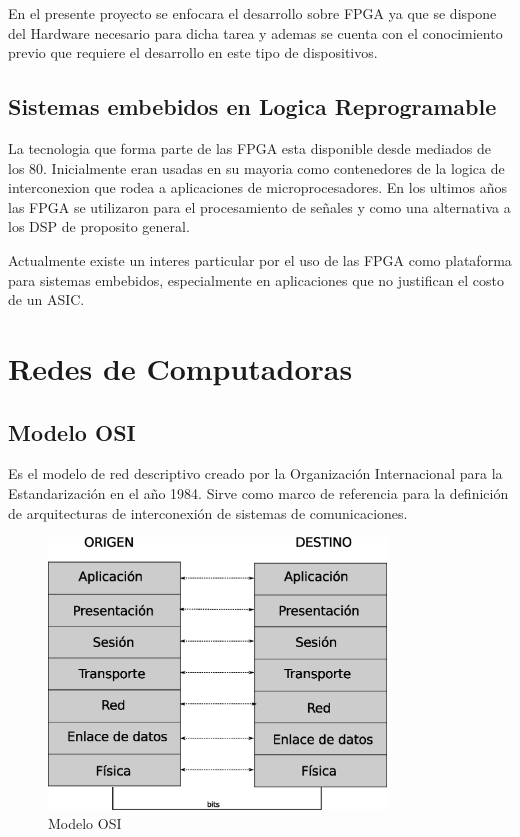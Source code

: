 En el presente proyecto se enfocara el desarrollo sobre FPGA ya que se dispone del Hardware necesario para dicha tarea y ademas se cuenta con el conocimiento previo que requiere el desarrollo en este tipo de dispositivos.
 

\subsection{Sistemas embebidos en Logica Reprogramable}

La tecnologia que forma parte de las FPGA esta disponible desde mediados de los 80. Inicialmente eran usadas en su mayoria como contenedores de la logica de interconexion que rodea a aplicaciones de microprocesadores. 
En los ultimos años las FPGA se utilizaron para el procesamiento de señales y como una alternativa a los DSP de proposito general.

Actualmente existe un interes particular por el uso de las FPGA como plataforma para sistemas embebidos, especialmente en aplicaciones que no justifican el costo de un ASIC.




\section{Redes de Computadoras}

\subsection{Modelo OSI}

Es el modelo de red descriptivo creado por la Organización Internacional para la Estandarización en el año 1984. Sirve como marco de referencia para la definición de arquitecturas de interconexión de sistemas de comunicaciones.

\begin{figure}[h]
  \centering
	\includegraphics[width=0.80\textwidth]{2-sistema/graf/osi.eps}
  \caption{Modelo OSI}
  \label{fig:osi}
\end{figure}

